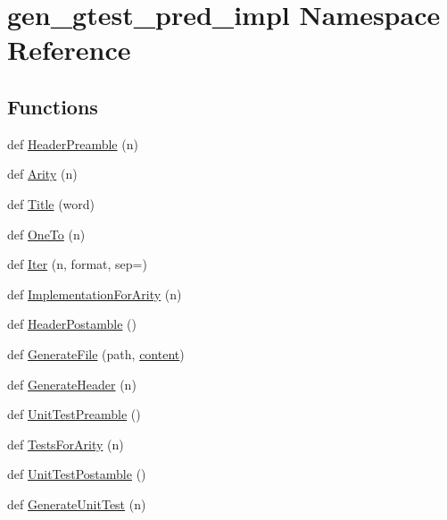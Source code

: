 \hypertarget{namespacegen__gtest__pred__impl}{}\section{gen\+\_\+gtest\+\_\+pred\+\_\+impl Namespace Reference}
\label{namespacegen__gtest__pred__impl}
\subsection*{Functions}
\begin{DoxyCompactItemize}
\item 
def \hyperlink{namespacegen__gtest__pred__impl_a0b99cadcffab4bf161654a382163bac8}{Header\+Preamble} (n)
\item 
def \hyperlink{namespacegen__gtest__pred__impl_a5bbb7272f3588b969ab3ded6f49836a1}{Arity} (n)
\item 
def \hyperlink{namespacegen__gtest__pred__impl_ae49dd9bd9152dbcb3ca7994ce04c37ba}{Title} (word)
\item 
def \hyperlink{namespacegen__gtest__pred__impl_a7920598d51c9dded76a4ef9ffde339e4}{One\+To} (n)
\item 
def \hyperlink{namespacegen__gtest__pred__impl_ac016218b7c9437d1d5ac85c574c83069}{Iter} (n, format, sep=\textquotesingle{}\textquotesingle{})
\item 
def \hyperlink{namespacegen__gtest__pred__impl_a8c53b141b89f9c05d0131d9756dfeab0}{Implementation\+For\+Arity} (n)
\item 
def \hyperlink{namespacegen__gtest__pred__impl_a3d40c7ef70cf4d46e56c9612f34027bf}{Header\+Postamble} ()
\item 
def \hyperlink{namespacegen__gtest__pred__impl_a16210fe365dfd176e04aa2578ac5a8d9}{Generate\+File} (path, \hyperlink{resize_8js_abaa405b2de1fea05ef421122098b4750}{content})
\item 
def \hyperlink{namespacegen__gtest__pred__impl_a6f3039a82a5283846fb272f8a3af6743}{Generate\+Header} (n)
\item 
def \hyperlink{namespacegen__gtest__pred__impl_ae52dc86461d1b666c7b658a8c27c69f9}{Unit\+Test\+Preamble} ()
\item 
def \hyperlink{namespacegen__gtest__pred__impl_ab0da913fa15e5695d5bb2dd1de5dec57}{Tests\+For\+Arity} (n)
\item 
def \hyperlink{namespacegen__gtest__pred__impl_a57b922f50d0807896496dcd883c1f098}{Unit\+Test\+Postamble} ()
\item 
def \hyperlink{namespacegen__gtest__pred__impl_acbd42b5b7fb7ddbb06a4dd58fc37e9ed}{Generate\+Unit\+Test} (n)
\end{DoxyCompactItemize}
